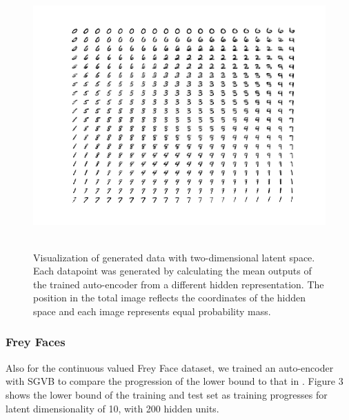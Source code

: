 \documentclass{article}
\begin{document}
\begin{figure}[htb]
\begin{center}
\includegraphics[height=4in,width=5in]{manifoldMNIST.png}
\caption{Visualization of generated data with two-dimensional latent space. Each datapoint was generated by calculating the mean outputs of the trained auto-encoder from a different hidden representation. The position in the total image reflects the coordinates of the hidden space and each image represents equal probability mass.}
\end{center}
\end{figure}

\subsubsection{Frey Faces}

Also for the continuous valued Frey Face dataset, we trained an auto-encoder with SGVB to compare the progression of the lower bound to that in \cite{kingma2013auto}. Figure 3 shows the lower bound of the training and test set as training progresses for latent dimensionality of 10, with 200 hidden units.
\end{document}
